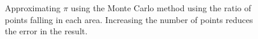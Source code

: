 \begin{figure}
    \centering
    \caption[Approximating $\pi$ using the monte carlo method]{Approximating $\pi$ using the Monte Carlo method using the ratio of points falling in each area. Increasing the number of points reduces the error in the result.}
    \label{fig:monte carlo pi}
\end{figure}

